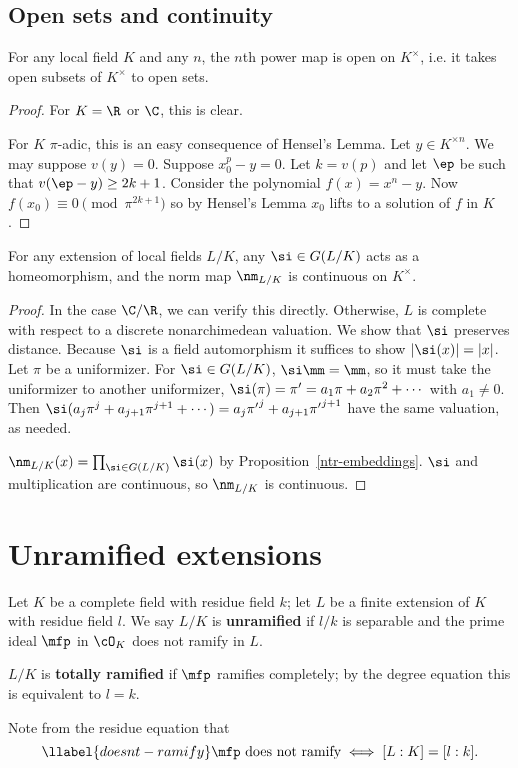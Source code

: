 \subsection{Open sets and continuity}
\begin{pr}
For any local field $K$ and any $n$, the $n$th power map is open on $K^{\times}$, i.e. it takes open subsets of $K^{\times}$ to open sets.
\end{pr}
\begin{proof}
For $K=\R$ or $\C$, this is clear.

For $K$ $\pi$-adic, this is an easy consequence of Hensel's Lemma. Let $y\in K^{\times n}$. We may suppose $v(y)=0$. Suppose $x_0^p-y=0$. Let $k=v(p)$ and
let $\ep$ be such that $v(\ep-y)\ge 2k+1$. Consider the polynomial $f(x)=x^n-y$. Now $f(x_0)\equiv 0\pmod{\pi^{2k+1}}$ so by Hensel's Lemma $x_0$ lifts to a solution of $f$ in $K$. 
\end{proof}
\begin{pr}
For any extension of local fields $L/K$, any $\si\in G(L/K)$ acts as a homeomorphism, and the norm map $\nm_{L/K}$ is continuous on $K^{\times}$.
\end{pr}
\begin{proof}
In the case $\C/\R$, we can verify this directly. Otherwise, $L$ is complete with respect to a discrete nonarchimedean valuation. We show that $\si$ preserves distance. Because $\si$ is a field automorphism it suffices to show $|\si(x)|=|x|$. 
Let $\pi$ be a uniformizer. For $\si\in G(L/K)$, $\si \mm=\mm$, so it must take the uniformizer to another uniformizer, $\si(\pi)=\pi'=a_1\pi+a_2\pi^2+\cdots $ with $a_1\ne 0$. Then $\si(a_j\pi^j+a_{j+1}\pi^{j+1}+\cdots)=a_j{\pi'}^j+a_{j+1}{\pi'}^{j+1}$ have the same valuation, as needed. 

$\nm_{L/K}(x) = \prod_{\si\in G(L/K)}\si(x)$ by Proposition~\ref{ntr-embeddings}. $\si$ and multiplication are continuous, so $\nm_{L/K}$ is continuous.
\end{proof}
\section{Unramified extensions}
\begin{df}
Let $K$ be a complete field with residue field $k$; let $L$ be a finite extension of $K$ with residue field $l$. We say $L/K$ is \textbf{unramified} if $l/k$ is separable and the prime ideal $\mfp$ in $\cO_K$ does not ramify in $L$.

$L/K$ is \textbf{totally ramified} if $\mfp$ ramifies completely; by the degree equation this is equivalent to $l=k$.
\end{df}
Note from the residue equation that 
\begin{equation}\llabel{doesnt-ramify}
\mfp\text{ does not ramify} \iff [L:K]=[l:k].
\end{equation}

